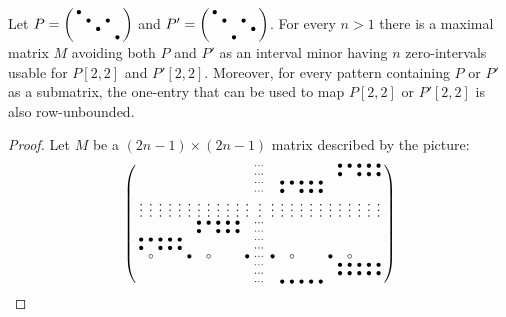 \begin{lemma}
\label{lemma:unbound2}
Let $P=\left(\begin{smallmatrix}\bullet& & & & \\ &\bullet& &\bullet& \\ & &\bullet& & \\ & & & &\bullet\end{smallmatrix}\right)$ and $P'=\left(\begin{smallmatrix}\bullet& & & & \\ &\bullet& &\bullet& \\ & & & &\bullet\\ & &\bullet& & \end{smallmatrix}\right)$. For every $n>1$ there is a maximal matrix $M$ avoiding both $P$ and $P'$ as an interval minor having $n$ zero-intervals usable for $P[2,2]$ and $P'[2,2]$. Moreover, for every pattern containing $P$ or $P'$ as a submatrix, the one-entry that can be used to map $P[2,2]$ or $P'[2,2]$ is also row-unbounded.
\end{lemma}
\begin{proof} Let $M$ be a $(2n-1)\times(2n-1)$ matrix described by the picture:
$$\left(\begin{smallmatrix}	 & & & & & & & & & & & &\cdots& & & & & & & &\bullet&\bullet&\bullet&\bullet&\bullet\\
		 & & & & & & & & & & & &\cdots& & & & & & & &\bullet& &\bullet&\bullet&\bullet\\
		 & & & & & & & & & & & &\cdots& &\bullet&\bullet&\bullet&\bullet&\bullet& & \\
		 & & & & & & & & & & & &\cdots& &\bullet& &\bullet&\bullet&\bullet& & \\
		\vdots&\vdots&\vdots&\vdots&\vdots&\vdots&\vdots&\vdots&\vdots&\vdots&\vdots&\vdots&\vdots&\vdots&\vdots&\vdots&\vdots&\vdots&\vdots&\vdots&\vdots&\vdots&\vdots&\vdots&\vdots\\
		 & & & & & &\bullet&\bullet&\bullet&\bullet&\bullet& &\cdots& & & & & \\
		 & & & & & &\bullet& &\bullet&\bullet&\bullet& &\cdots& & & & & \\
		\bullet&\bullet&\bullet&\bullet&\bullet& & & & & & & &\cdots& & & & & \\
		\bullet& &\bullet&\bullet&\bullet& & & & & & & &\cdots& & & & & \\
		 &\circ& & & &\bullet& &\circ& & & &\bullet&\cdots&\bullet& &\circ& & & &\bullet& &\circ& & & \\
		 & & & & & & & & & & & &\cdots& & & & & & & &\bullet&\bullet&\bullet&\bullet&\bullet\\
		 & & & & & & & & & & & &\cdots& & & & & & & &\bullet&\bullet&\bullet&\bullet&\bullet\\
		 & & & & & & & & & & & &\cdots& &\bullet&\bullet&\bullet&\bullet&\bullet& & \\
\end{smallmatrix}\right)$$
\end{proof}
